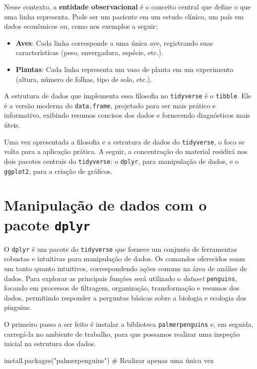 \documentclass[
  12pt,
  letterpaper,
  DIV=11,
  numbers=noendperiod]{scrreprt}
\newenvironment{Shaded}{\begin{snugshade}}{\end{snugshade}}
\newcommand{\CommentTok}[1]{\textcolor[rgb]{0.37,0.37,0.37}{#1}}
\newcommand{\FunctionTok}[1]{\textcolor[rgb]{0.28,0.35,0.67}{#1}}
\newcommand{\NormalTok}[1]{\textcolor[rgb]{0.00,0.23,0.31}{#1}}
\newcommand{\StringTok}[1]{\textcolor[rgb]{0.13,0.47,0.30}{#1}}
\providecommand{\tightlist}{%
  \setlength{\itemsep}{0pt}\setlength{\parskip}{0pt}}\usepackage{longtable,booktabs,array}
\begin{document}
Nesse contexto, a \textbf{entidade observacional} é o conceito central
que define o que uma linha representa. Pode ser um paciente em um estudo
clínico, um país em dados econômicos ou, como nos exemplos a seguir:

\begin{itemize}
\tightlist
\item
  \textbf{Aves}: Cada linha corresponde a uma única ave, registrando
  suas características (peso, envergadura, espécie, etc.).
\item
  \textbf{Plantas}: Cada linha representa um vaso de planta em um
  experimento (altura, número de folhas, tipo de solo, etc.).
\end{itemize}

A estrutura de dados que implementa essa filosofia no \texttt{tidyverse}
é o \texttt{tibble}. Ele é a versão moderna do \texttt{data.frame},
projetado para ser mais prático e informativo, exibindo resumos concisos
dos dados e fornecendo diagnósticos mais úteis.

Uma vez apresentada a filosofia e a estrutura de dados do
\texttt{tidyverse}, o foco se volta para a aplicação prática. A seguir,
a concentração do material residirá nos dois pacotes centrais do
\texttt{tidyverse}: o \texttt{dplyr}, para manipulação de dados, e o
\texttt{ggplot2}, para a criação de gráficos.

\section{\texorpdfstring{Manipulação de dados com o pacote
\texttt{dplyr}}{Manipulação de dados com o pacote dplyr}}\label{manipulauxe7uxe3o-de-dados-com-o-pacote-dplyr}

O \texttt{dplyr} é um pacote do \texttt{tidyverse} que fornece um
conjunto de ferramentas robustas e intuitivas para manipulação de dados.
Os comandos oferecidos soam um tanto quanto intuitivos, correspondendo
ações comuns na área de análise de dados. Para explorar as principais
funções será utilizado o \emph{dataset} \texttt{penguins}, focando em
processos de filtragem, organização, transformação e resumos dos dados,
permitindo responder a perguntas básicas sobre a biologia e ecologia dos
pinguins.

O primeiro passo a ser feito é instalar a biblioteca
\texttt{palmerpenguins} e, em seguida, carregá-la no ambiente de
trabalho, para que possamos realizar uma inspeção inicial na estrutura
dos dados.

\begin{Shaded}
\begin{Highlighting}[]
\FunctionTok{install.packages}\NormalTok{(}\StringTok{"palmerpenguins"}\NormalTok{) }\CommentTok{\# Realizar apenas uma única vez}
\end{Highlighting}
\end{Shaded}
\end{document}
